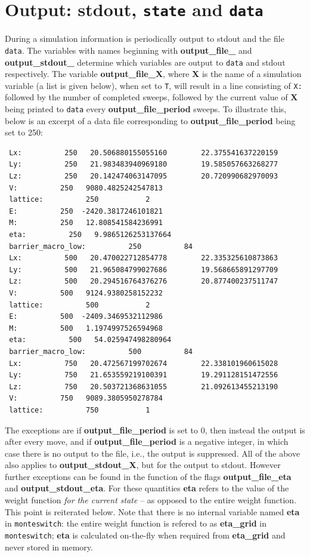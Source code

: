 \documentclass{report}
\begin{document}
\section{Output: stdout, \texttt{state} and \texttt{data}}\label{sec:output}
During a simulation information is periodically output to stdout and the file \texttt{data}. The variables with names beginning with 
\textbf{output\_file\_} and \textbf{output\_stdout\_} determine which variables are output to \texttt{data} and stdout respectively.
The variable \textbf{output\_file\_X}, where \textbf{X} is the name of a simulation variable (a list is given below), when set to \texttt{T}, 
will result in a line consisting of \texttt{X: } followed by the number of completed sweeps, followed by the current value of \textbf{X} 
being printed to \texttt{data} every \textbf{output\_file\_period} sweeps. To illustrate this, below is an excerpt of a data file corresponding
to \textbf{output\_file\_period} being set to 250:
\begin{verbatim}
 Lx:          250   20.506880155055160        22.375541637220159     
 Ly:          250   21.983483940969180        19.585057663268277     
 Lz:          250   20.142474063147095        20.720990682970093     
 V:          250   9080.4825242547813     
 lattice:          250           2
 E:          250  -2420.3817246101821     
 M:          250   12.808541584236991     
 eta:          250   9.9865126253137664     
 barrier_macro_low:          250          84
 Lx:          500   20.470022712854778        22.335325610873863     
 Ly:          500   21.965084799027686        19.568665891297709     
 Lz:          500   20.294516764376276        20.877400237511747     
 V:          500   9124.9380258152232     
 lattice:          500           2
 E:          500  -2409.3469532112986     
 M:          500   1.1974997526594968     
 eta:          500   54.025947498280964     
 barrier_macro_low:          500          84
 Lx:          750   20.472567199702674        22.338101960615028     
 Ly:          750   21.653559219100391        19.291128151472556     
 Lz:          750   20.503721368631055        21.092613455213190     
 V:          750   9089.3805950278784     
 lattice:          750           1
\end{verbatim}
The exceptions are if \textbf{output\_file\_period} is set to 0, then instead the output is after every move, and if \textbf{output\_file\_period} is a 
negative integer, in which case there is no output to the file, i.e., the output is suppressed. All of the above also applies to 
\textbf{output\_stdout\_X}, but for the output to stdout. 
However further exceptions can be found in the function of the flags \textbf{output\_file\_eta} and \textbf{output\_stdout\_eta}. For these quantities 
\textbf{eta} refers to the value of the weight function \emph{for the current state} -- as opposed to the entire weight function. This point is 
reiterated below.
Note that there is no internal variable named \textbf{eta} in \verb|monteswitch|: the entire weight function is refered to as \textbf{eta\_grid}
in \verb|monteswitch|; \textbf{eta} is calculated on-the-fly when required from \textbf{eta\_grid} and never stored in memory.
\end{document}
